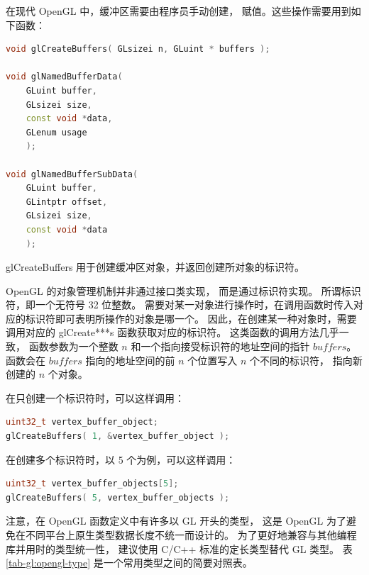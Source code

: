 \documentclass[fontset=windows]{ctexart}
\begin{document}
在现代 OpenGL 中，缓冲区需要由程序员手动创建，
赋值。这些操作需要用到如下函数：

\begin{lstlisting}[language=c++]
void glCreateBuffers( GLsizei n, GLuint * buffers );

void glNamedBufferData(
    GLuint buffer,
    GLsizei size,
    const void *data,
    GLenum usage
    );

void glNamedBufferSubData(
    GLuint buffer,
    GLintptr offset,
    GLsizei size,
    const void *data
    );
\end{lstlisting}

glCreateBuffers 用于创建缓冲区对象，并返回创建所对象的标识符。

OpenGL 的对象管理机制并非通过接口类实现，
而是通过标识符实现。
所谓标识符，即一个无符号 32 位整数。
需要对某一对象进行操作时，在调用函数时传入对应的标识符即可表明所操作的对象是哪一个。
因此，在创建某一种对象时，需要调用对应的 glCreate***s 函数获取对应的标识符。
这类函数的调用方法几乎一致，
函数参数为一个整数 $n$ 和一个指向接受标识符的地址空间的指针 $buffers$。
函数会在 $buffers$ 指向的地址空间的前 $n$ 个位置写入 $n$ 个不同的标识符，
指向新创建的 $n$ 个对象。

在只创建一个标识符时，可以这样调用：

\begin{lstlisting}[language=c++]
uint32_t vertex_buffer_object;
glCreateBuffers( 1, &vertex_buffer_object );
\end{lstlisting}

在创建多个标识符时，以 5 个为例，可以这样调用：

\begin{lstlisting}[language=c++]
uint32_t vertex_buffer_objects[5];
glCreateBuffers( 5, vertex_buffer_objects );
\end{lstlisting}

注意，在 OpenGL 函数定义中有许多以 GL 开头的类型，
这是 OpenGL 为了避免在不同平台上原生类型数据长度不统一而设计的。
为了更好地兼容与其他编程库并用时的类型统一性，
建议使用 C/C++ 标准的定长类型替代 GL 类型。
表 \ref{tab-gl:opengl-type} 是一个常用类型之间的简要对照表。
\end{document}
